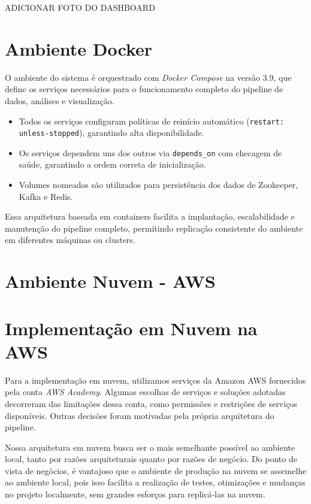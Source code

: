 \documentclass[a4paper,12pt]{article}
\begin{document}
ADICIONAR FOTO DO DASHBOARD


\section{Ambiente Docker}

O ambiente do sistema é orquestrado com \textit{Docker Compose} na versão 3.9, que define os serviços necessários para o funcionamento completo do pipeline de dados, análises e visualização.


\begin{itemize}
    \item Todos os serviços configuram políticas de reinício automático (\texttt{restart: unless-stopped}), garantindo alta disponibilidade.
    \item Os serviços dependem uns dos outros via \texttt{depends\_on} com checagem de saúde, garantindo a ordem correta de inicialização.
    \item Volumes nomeados são utilizados para persistência dos dados de Zookeeper, Kafka e Redis.
\end{itemize}

Essa arquitetura baseada em containers facilita a implantação, escalabilidade e manutenção do pipeline completo, permitindo replicação consistente do ambiente em diferentes máquinas ou clusters.


\section{Ambiente Nuvem - AWS}
\section{Implementação em Nuvem na AWS}

Para a implementação em nuvem, utilizamos serviços da Amazon AWS fornecidos pela conta \textit{AWS Academy}. Algumas escolhas de serviços e soluções adotadas decorreram das limitações dessa conta, como permissões e restrições de serviços disponíveis. Outras decisões foram motivadas pela própria arquitetura do pipeline.

Nossa arquitetura em nuvem busca ser o mais semelhante possível ao ambiente local, tanto por razões arquiteturais quanto por razões de negócio. Do ponto de vista de negócios, é vantajoso que o ambiente de produção na nuvem se assemelhe ao ambiente local, pois isso facilita a realização de testes, otimizações e mudanças no projeto localmente, sem grandes esforços para replicá-las na nuvem.
\end{document}
